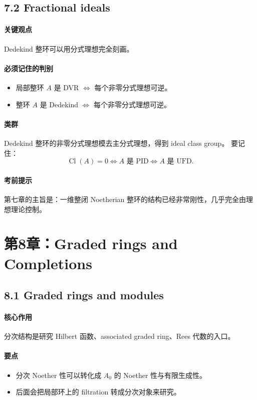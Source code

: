 \documentclass[a4paper]{ctexart}
\begin{document}
\subsection{7.2 Fractional ideals}

\paragraph{关键观点}
Dedekind 整环可以用分式理想完全刻画。

\paragraph{必须记住的判别}
\begin{itemize}
  \item 局部整环 \(A\) 是 DVR
  \(\Longleftrightarrow\)
  每个非零分式理想可逆。
  \item 整环 \(A\) 是 Dedekind
  \(\Longleftrightarrow\)
  每个非零分式理想可逆。
\end{itemize}

\paragraph{类群}
Dedekind 整环的非零分式理想模去主分式理想，得到 ideal class group。
要记住：
\[
\operatorname{Cl}(A)=0
\Longleftrightarrow
A \text{ 是 PID}
\Longleftrightarrow
A \text{ 是 UFD}.
\]

\paragraph{考前提示}
第七章的主旨是：一维整闭 Noetherian 整环的结构已经非常刚性，几乎完全由理想理论控制。

\section{第8章：Graded rings and Completions}

\subsection{8.1 Graded rings and modules}

\paragraph{核心作用}
分次结构是研究 Hilbert 函数、associated graded ring、Rees 代数的入口。

\paragraph{要点}
\begin{itemize}
  \item 分次 Noether 性可以转化成 \(A_0\) 的 Noether 性与有限生成性。
  \item 后面会把局部环上的 filtration 转成分次对象来研究。
\end{itemize}
\end{document}
